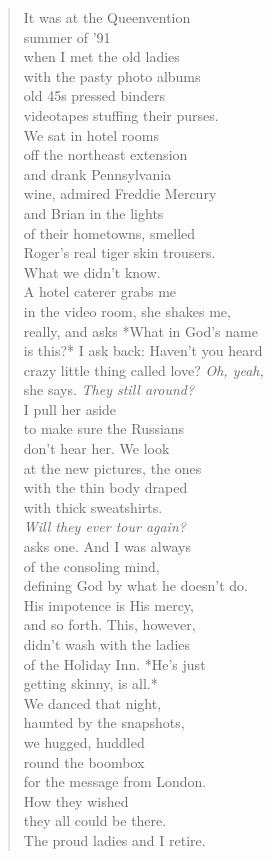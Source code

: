 \documentclass[
]{memoir}
\begin{document}
\begin{verse}
It was at the Queenvention\\
summer of '91\\
when I met the old ladies\\
with the pasty photo albums\\
old 45s pressed binders\\
videotapes stuffing their purses.\\
We sat in hotel rooms\\
off the northeast extension\\
and drank Pennsylvania\\
wine, admired Freddie Mercury\\
and Brian in the lights\\
of their hometowns, smelled\\
Roger's real tiger skin trousers.\\
What we didn't know.\\
A hotel caterer grabs me\\
in the video room, she shakes me,\\
really, and asks *What in God's name\\
is this?* I ask back: Haven't you heard\\
crazy little thing called love? \emph{Oh, yeah,}\\
she says. \emph{They still around?}\\
I pull her aside\\
to make sure the Russians\\
don't hear her. We look\\
at the new pictures, the ones\\
with the thin body draped\\
with thick sweatshirts.\\
\emph{Will they ever tour again?}\\
asks one. And I was always\\
of the consoling mind,\\
defining God by what he doesn't do.\\
His impotence is His mercy,\\
and so forth. This, however,\\
didn't wash with the ladies\\
of the Holiday Inn. *He's just\\
getting skinny, is all.*\\
We danced that night,\\
haunted by the snapshots,\\
we hugged, huddled\\
round the boombox\\
for the message from London.\\
How they wished\\
they all could be there.\\
The proud ladies and I retire.\\
\end{verse}
\end{document}
